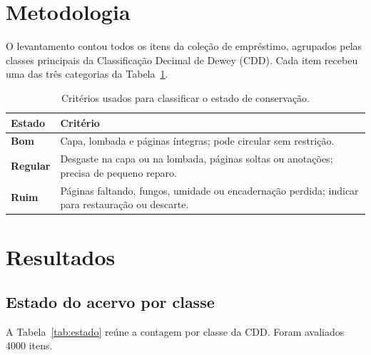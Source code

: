 \documentclass[11pt,a4paper]{report}
\newif\ifinstrucoes
\newcommand{\instrucao}[1]{\ifinstrucoes{\color{gray}\small\itshape #1\par}\fi}
\newcommand{\totalacervo}{4000}
\begin{document}
\section{Metodologia}
\instrucao{Explique como os itens foram contados e avaliados: censo ou amostra, período, critérios de cada categoria e quem fez a avaliação. Uma tabela de critérios ajuda quem for repetir o levantamento.}

O levantamento contou todos os itens da coleção de empréstimo, agrupados pelas classes principais da Classificação Decimal de Dewey (CDD). Cada item recebeu uma das três categorias da Tabela~\ref{tab:criterios}.

\begin{table}[htbp]
  \centering
  \caption{Critérios usados para classificar o estado de conservação.}
  \label{tab:criterios}
  \renewcommand{\arraystretch}{1.3}
  \begin{tabular}{>{\bfseries}l p{10.5cm}}
    \toprule
    Estado & Critério \\
    \midrule
    {\color{bom}Bom}         & Capa, lombada e páginas íntegras; pode circular sem restrição. \\
    {\color{regular}Regular} & Desgaste na capa ou na lombada, páginas soltas ou anotações; precisa de pequeno reparo. \\
    {\color{ruim}Ruim}       & Páginas faltando, fungos, umidade ou encadernação perdida; indicar para restauração ou descarte. \\
    \bottomrule
  \end{tabular}
\end{table}

\section{Resultados}
\instrucao{Mostre os números em tabela e resuma as proporções em gráficos. Comente as classes com maior proporção de itens em estado ruim.}

\subsection{Estado do acervo por classe}

A Tabela~\ref{tab:estado} reúne a contagem por classe da CDD. Foram avaliados \totalacervo{} itens.
\end{document}
